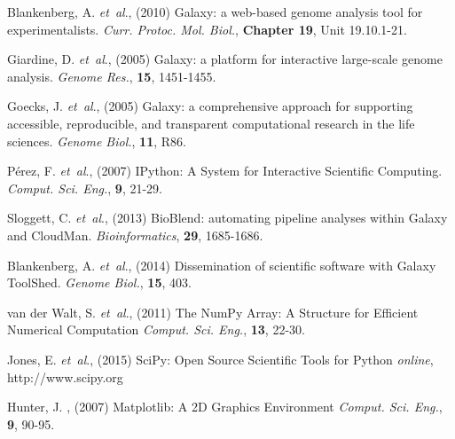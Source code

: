 \documentclass{bioinfo}
\begin{document}
\begin{thebibliography}{}
Blankenberg, A. {\it et~al}., (2010) Galaxy: a web-based genome analysis tool for experimentalists. \textit{Curr. Protoc. Mol. Biol.},  {\bf Chapter 19}, Unit 19.10.1-21.

Giardine, D. {\it et~al}., (2005) Galaxy: a platform for interactive large-scale genome analysis. \textit{Genome Res.},  {\bf 15}, 1451-1455.

Goecks, J. {\it et~al}., (2005) Galaxy: a comprehensive approach for supporting accessible, reproducible, and transparent computational research in the life sciences. \textit{Genome Biol.},  {\bf 11}, R86.

P\'erez, F. {\it et~al}., (2007) IPython: A System for Interactive Scientific Computing. \textit{Comput. Sci. Eng.}, {\bf 9}, 21-29.

Sloggett, C. {\it et~al}., (2013) BioBlend: automating pipeline analyses within Galaxy and CloudMan. \textit{Bioinformatics}, {\bf 29}, 1685-1686.

Blankenberg, A. {\it et~al}., (2014) Dissemination of scientific software with Galaxy ToolShed. \textit{Genome Biol.}, {\bf 15}, 403.

van der Walt, S. {\it et~al}., (2011) The NumPy Array: A Structure for Efficient Numerical Computation \textit{Comput. Sci. Eng.}, {\bf 13}, 22-30.

Jones, E. {\it et~al}., (2015) SciPy: Open Source Scientific Tools for Python  \textit{online}, http://www.scipy.org

Hunter, J. , (2007) Matplotlib: A 2D Graphics Environment \textit{Comput. Sci. Eng.}, {\bf 9}, 90-95.


\end{thebibliography}
\end{document}
